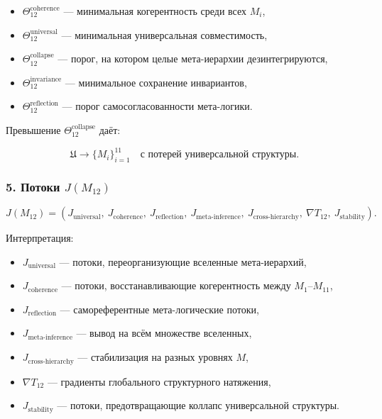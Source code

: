 \begin{itemize}
    \item $\Theta_{12}^{\mathrm{coherence}}$ — минимальная когерентность среди всех $M_i$,
    \item $\Theta_{12}^{\mathrm{universal}}$ — минимальная универсальная совместимость,
    \item $\Theta_{12}^{\mathrm{collapse}}$ — порог, на котором целые мета-иерархии дезинтегрируются,
    \item $\Theta_{12}^{\mathrm{invariance}}$ — минимальное сохранение инвариантов,
    \item $\Theta_{12}^{\mathrm{reflection}}$ — порог самосогласованности мета-логики.
\end{itemize}

Превышение $\Theta_{12}^{\mathrm{collapse}}$ даёт:

\[
\mathfrak{U} \to \{ M_i \}_{i=1}^{11}
\quad\text{с потерей универсальной структуры}.
\]

\subsubsection*{5. Потоки $J(M_{12})$}

\[
J(M_{12})=
(
J_{\mathrm{universal}},\
J_{\mathrm{coherence}},\
J_{\mathrm{reflection}},\
J_{\mathrm{meta\mbox{-}inference}},\
J_{\mathrm{cross\mbox{-}hierarchy}},\
\nabla T_{12},\
J_{\mathrm{stability}}
).
\]

Интерпретация:

\begin{itemize}
    \item $J_{\mathrm{universal}}$ — потоки, переорганизующие вселенные мета-иерархий,
    \item $J_{\mathrm{coherence}}$ — потоки, восстанавливающие когерентность между $M_1$–$M_{11}$,
    \item $J_{\mathrm{reflection}}$ — самореферентные мета-логические потоки,
    \item $J_{\mathrm{meta\mbox{-}inference}}$ — вывод на всём множестве вселенных,
    \item $J_{\mathrm{cross\mbox{-}hierarchy}}$ — стабилизация на разных уровнях $M$,
    \item $\nabla T_{12}$ — градиенты глобального структурного натяжения,
    \item $J_{\mathrm{stability}}$ — потоки, предотвращающие коллапс универсальной структуры.
\end{itemize}

